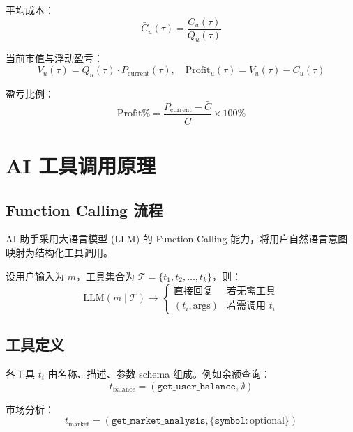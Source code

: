 \documentclass[12pt,a4paper]{article}
\begin{document}
平均成本：
\begin{equation}
\bar{C}_u(\tau) = \frac{C_u(\tau)}{Q_u(\tau)}
\end{equation}

当前市值与浮动盈亏：
\begin{equation}
V_u(\tau) = Q_u(\tau) \cdot P_{\mathrm{current}}(\tau), \quad \mathrm{Profit}_u(\tau) = V_u(\tau) - C_u(\tau)
\end{equation}

盈亏比例：
\begin{equation}
\mathrm{Profit}\% = \frac{P_{\mathrm{current}} - \bar{C}}{\bar{C}} \times 100\%
\end{equation}

\section{AI 工具调用原理}

\subsection{Function Calling 流程}

AI 助手采用大语言模型 (LLM) 的 Function Calling 能力，将用户自然语言意图映射为结构化工具调用。

设用户输入为 $m$，工具集合为 $\mathcal{T} = \{t_1, t_2, \ldots, t_k\}$，则：
\begin{equation}
\mathrm{LLM}(m \mid \mathcal{T}) \to \begin{cases}
\text{直接回复} & \text{若无需工具} \\
(t_i, \mathrm{args}) & \text{若需调用 } t_i
\end{cases}
\end{equation}

\subsection{工具定义}

各工具 $t_i$ 由名称、描述、参数 schema 组成。例如余额查询：
\begin{equation}
t_{\mathrm{balance}} = (\mathtt{get\_user\_balance}, \emptyset)
\end{equation}

市场分析：
\begin{equation}
t_{\mathrm{market}} = (\mathtt{get\_market\_analysis}, \{\mathtt{symbol}: \mathrm{optional}\})
\end{equation}
\end{document}
